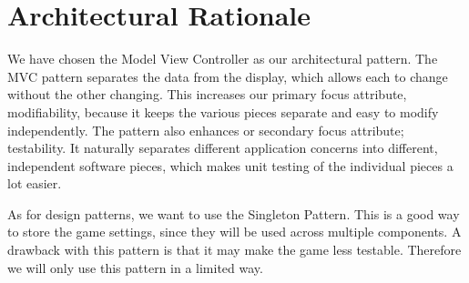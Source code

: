 \chapter{Architectural Rationale}
We have chosen the Model View Controller as our architectural pattern. The MVC pattern separates the data from the display, which allows each to change without the other changing. This increases our primary focus attribute, modifiability, because it keeps the various pieces separate and easy to modify independently. The pattern also enhances or secondary focus attribute; testability. It naturally separates different application concerns into different, independent software pieces, which makes unit testing of the individual pieces a lot easier.

As for design patterns, we want to use the Singleton Pattern. This is a good way to store the game settings, since they will be used across multiple components. A drawback with this pattern is that it may make the game less testable. Therefore we will only use this pattern in a limited way.